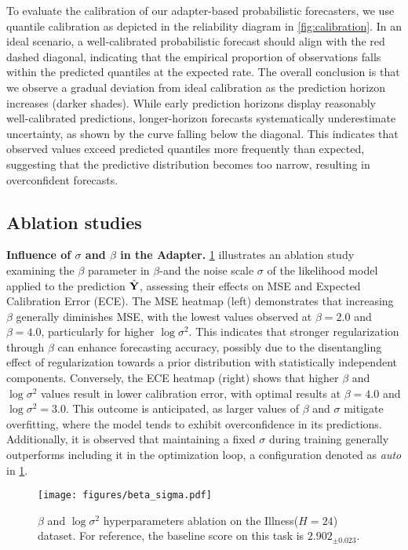 To evaluate the calibration of our adapter-based probabilistic forecasters, we use quantile calibration as depicted in the reliability diagram in \cref{fig:calibration}. In an ideal scenario, a well-calibrated probabilistic forecast should align with the red dashed diagonal, indicating that the empirical proportion of observations falls within the predicted quantiles at the expected rate. The overall conclusion is that we observe a gradual deviation from ideal calibration as the prediction horizon increases (darker shades). While early prediction horizons display reasonably well-calibrated predictions, longer-horizon forecasts systematically underestimate uncertainty, as shown by the curve falling below the diagonal. This indicates that observed values exceed predicted quantiles more frequently than expected, suggesting that the predictive distribution becomes too narrow, resulting in overconfident forecasts.

\subsection{Ablation studies}

\noindent\textbf{Influence of $\sigma$ and $\beta$ in the \vae Adapter.} \cref{fig:beta_sigma} illustrates an ablation study examining the $\beta$ parameter in $\beta$-\vae and the noise scale $\sigma$ of the likelihood model applied to the prediction $\hat{\mathbf{Y}}$, assessing their effects on MSE and Expected Calibration Error (ECE). The MSE heatmap (left) demonstrates that increasing $\beta$ generally diminishes MSE, with the lowest values observed at $\beta = 2.0$ and $\beta = 4.0$, particularly for higher $\log \sigma^2$. This indicates that stronger regularization through $\beta$ can enhance forecasting accuracy, possibly due to the disentangling effect of regularization towards a prior distribution with statistically independent components. Conversely, the ECE heatmap (right) shows that higher $\beta$ and $\log \sigma^2$ values result in lower calibration error, with optimal results at $\beta = 4.0$ and $\log \sigma^2 = 3.0$. This outcome is anticipated, as larger values of $\beta$ and $\sigma$ mitigate overfitting, where the model tends to exhibit overconfidence in its predictions. Additionally, it is observed that maintaining a fixed $\sigma$ during training generally outperforms including it in the optimization loop, a configuration denoted as \emph{auto} in \cref{fig:beta_sigma}.

\begin{figure}[ht]
\centering
\texttt{[image: figures/beta\_sigma.pdf]}
\caption{$\beta$ and $\log \sigma^2$ \vae hyperparameters ablation on the Illness($H=24$) dataset. For reference, the \moment baseline score on this task is $2.902_{\pm 0.023}$.}
\label{fig:beta_sigma}
\end{figure}

